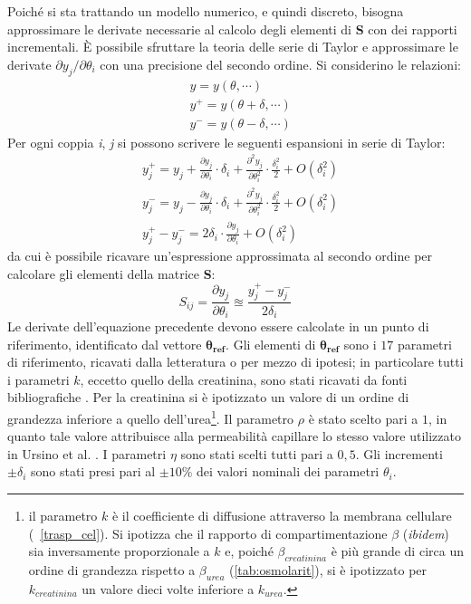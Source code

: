 Poiché si sta trattando un modello numerico, e quindi discreto, bisogna approssimare le derivate necessarie al calcolo degli elementi di \textbf{S} con dei rapporti incrementali. È possibile sfruttare la teoria delle serie di Taylor e approssimare le derivate $\partial y_j/\partial \theta_i$ con una precisione del secondo ordine. Si considerino le relazioni:
\begin{align*}
	&y       = y(\theta,\cdots) \\
	&y^+     = y(\theta + \delta,\cdots) \\
	&y^-     = y(\theta - \delta,\cdots)
\end{align*}
Per ogni coppia \textit{i}, \textit{j} si possono scrivere le seguenti espansioni in serie di Taylor:
\begin{align*}
	&y_j^+         = y_j + \frac{\partial y_j}{\partial \theta_i}\cdot\delta_i + \frac{\partial^2 y_j}{\partial \theta_i^2}\cdot\frac{\delta_i^2}{2} + O(\delta_i^2) \\
	&y_j^-         = y_j - \frac{\partial y_j}{\partial \theta_i}\cdot\delta_i + \frac{\partial^2 y_j}{\partial \theta_i^2}\cdot\frac{\delta_i^2}{2} + O(\delta_i^2) \\
	&y_j^+ - y_j^- = 2\delta_i\cdot\frac{\partial y_j}{\partial \theta_i} + O(\delta_i^2)
\end{align*}
da cui è possibile ricavare un'espressione approssimata al secondo ordine per calcolare gli elementi della matrice \textbf{S}:
\begin{equation}\label{eq:taylor}
	S_{ij} = \frac{\partial y_j}{\partial \theta_i} \approxeq \frac{y_j^+ - y_j^-}{2\delta_i}
\end{equation}
Le derivate dell'equazione precedente devono essere calcolate in un punto di riferimento, identificato dal vettore $\mathbf{\theta_{ref}}$. Gli elementi di $\mathbf{\theta_{ref}}$ sono i $17$ parametri di riferimento, ricavati dalla letteratura o per mezzo di ipotesi; in particolare tutti i parametri $k$, eccetto quello della creatinina, sono stati ricavati da fonti bibliografiche \cite{casagrande, gatti}. Per la creatinina si è ipotizzato un valore di un ordine di grandezza inferiore a quello dell'urea\footnote{il parametro $k$ è il coefficiente di diffusione attraverso la membrana cellulare (\textsection~\ref{trasp_cel}). Si ipotizza che il rapporto di compartimentazione $\beta$ (\textit{ibidem}) sia inversamente proporzionale a $k$ e, poiché $\beta_{creatinina}$ è più grande di circa un ordine di grandezza rispetto a $\beta_{urea}$ (\ref{tab:osmolarit}), si è ipotizzato per $k_{creatinina}$ un valore dieci volte inferiore a $k_{urea}$.}. Il parametro $\rho$ è stato scelto pari a $1$, in quanto tale valore attribuisce alla permeabilità capillare lo stesso valore utilizzato in Ursino et al. \cite{ursino}. I parametri $\eta$ sono stati scelti tutti pari a $0,5$. Gli incrementi $\pm\delta_i$ sono stati presi pari al $\pm 10\%$ dei valori nominali dei parametri $\theta_i$.
